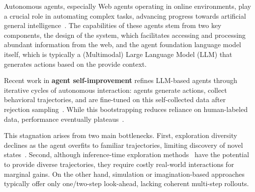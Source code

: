 \documentclass[11pt]{article}
\begin{document}
Autonomous agents, especially Web agents operating in online environments, play a crucial role in automating complex tasks, advancing progress towards artificial general intelligence~\citep{deep_research, manus, ui_tars, openmanus2025}.
The capabilities of these agents stem from two key components, the design of the system, which facilitates accessing and processing abundant information from the web, and the agent foundation language model itself, which is typically a (Multimodal) Large Language Model (LLM) that generates actions based on the provide context.

Recent work in \textbf{agent self-improvement} refines LLM-based agents through iterative cycles of autonomous interaction: agents generate actions, collect behavioral trajectories, and are fine-tuned on this self-collected data after rejection sampling~\citep{godal_agent, BAGEL, LLM_agent_can_self_improve, rest_meets_react, openwebvoyager, AgenGym}. While this bootstrapping reduces reliance on human-labeled data, performance eventually plateaus~\citep{B_STAR}.


This stagnation arises from two main bottlenecks. First, exploration diversity declines as the agent overfits to familiar trajectories, limiting discovery of novel states~\citep{openwebvoyager}. Second, although inference-time exploration methods~\citep{AgentTreeSearch, webpilot, LATS, AgentQ, Exact} have the potential to provide diverse trajectories, they require costly real-world interactions for marginal gains. 
On the other hand, simulation or imagination-based approaches~\citep{webdreamer, agent_world_model} typically offer only one/two-step look-ahead, lacking coherent multi-step rollouts.
\end{document}
